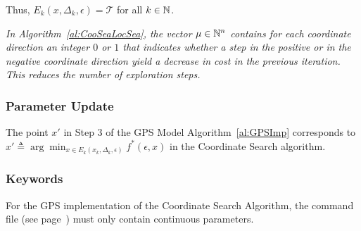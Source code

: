 \begin{minipage}[b]{\textwidth}
\begin{algorithm}
{
}
\end{algorithm}
\end{minipage}
Thus, $E_k(x, \Delta_k, \epsilon) = \mathcal T$ for all $k \in {\mathbb N}$.
\begin{remark}
{\em 
In Algorithm~\ref{al:CooSeaLocSea},
the vector $\mu \in {\mathbb N}^n$ contains for
each coordinate direction an integer $0$ or $1$ that indicates 
whether a step in the positive or
in the negative coordinate direction yield a decrease in cost in the previous
iteration. This reduces the number of exploration steps.
}
\rbox
\end{remark}

\subsubsection{Parameter Update}
The point $x'$ in Step 3 of the GPS Model Algorithm~\ref{al:GPSImp} 
corresponds to 
$x' \triangleq \arg \min_{x \in E_k(x_k, \Delta_k, \epsilon)} f^*(\epsilon,x)$
in the Coordinate Search algorithm.

\subsubsection{Keywords}
\label{sec:GPSCooSeaKeyWor}
For the GPS implementation of the Coordinate Search Algorithm, 
the command file (see page~\pageref{par:comFil}) must only contain continuous parameters.\\


